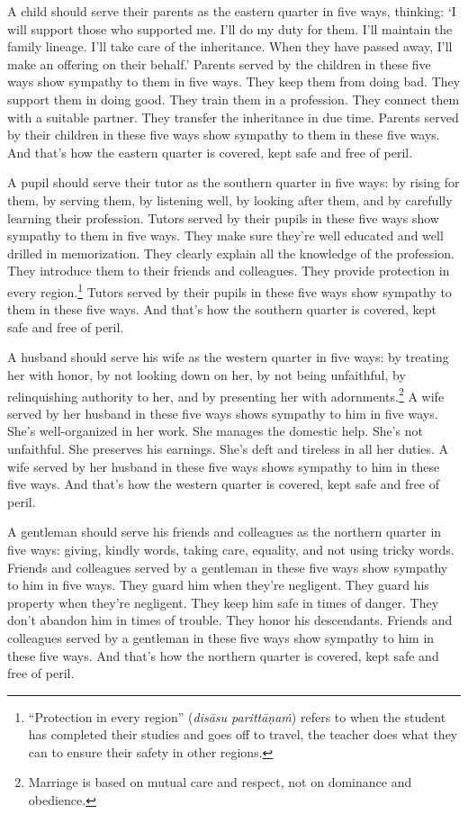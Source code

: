 \documentclass[12pt,openany]{book}%
\begin{document}
A child should serve their parents as the eastern quarter in five ways, thinking: ‘I will support those who supported me. I’ll do my duty for them. I’ll maintain the family lineage. I’ll take care of the inheritance. When they have passed away, I’ll make an offering on their behalf.’ Parents served by the children in these five ways show sympathy to them in five ways. They keep them from doing bad. They support them in doing good. They train them in a profession. They connect them with a suitable partner. They transfer the inheritance in due time. Parents served by their children in these five ways show sympathy to them in these five ways. And that’s how the eastern quarter is covered, kept safe and free of peril. 

A pupil should serve their tutor as the southern quarter in five ways: by rising for them, by serving them, by listening well, by looking after them, and by carefully learning their profession. Tutors served by their pupils in these five ways show sympathy to them in five ways. They make sure they’re well educated and well drilled in memorization. They clearly explain all the knowledge of the profession. They introduce them to their friends and colleagues. They provide protection in every region.\footnote{“Protection in every region” (\textit{\textsanskrit{disāsu} \textsanskrit{parittāṇaṁ}}) refers to when the student has completed their studies and goes off to travel, the teacher does what they can to ensure their safety in other regions. } Tutors served by their pupils in these five ways show sympathy to them in these five ways. And that’s how the southern quarter is covered, kept safe and free of peril. 

A husband should serve his wife as the western quarter in five ways: by treating her with honor, by not looking down on her, by not being unfaithful, by relinquishing authority to her, and by presenting her with adornments.\footnote{Marriage is based on mutual care and respect, not on dominance and obedience. } A wife served by her husband in these five ways shows sympathy to him in five ways. She’s well-organized in her work. She manages the domestic help. She’s not unfaithful. She preserves his earnings. She’s deft and tireless in all her duties. A wife served by her husband in these five ways shows sympathy to him in these five ways. And that’s how the western quarter is covered, kept safe and free of peril. 

A gentleman should serve his friends and colleagues as the northern quarter in five ways: giving, kindly words, taking care, equality, and not using tricky words. Friends and colleagues served by a gentleman in these five ways show sympathy to him in five ways. They guard him when they’re negligent. They guard his property when they’re negligent. They keep him safe in times of danger. They don’t abandon him in times of trouble. They honor his descendants. Friends and colleagues served by a gentleman in these five ways show sympathy to him in these five ways. And that’s how the northern quarter is covered, kept safe and free of peril. 
\end{document}
